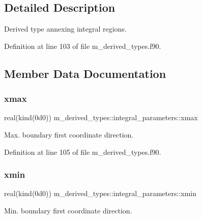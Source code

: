 \subsection{Detailed Description}
Derived type annexing integral regions. 

Definition at line 103 of file m\+\_\+derived\+\_\+types.\+f90.



\subsection{Member Data Documentation}
\mbox{\label{structm__derived__types_1_1integral__parameters_aede7130654b27625285fad0937c465d0}} 
\subsubsection{\texorpdfstring{xmax}{xmax}}
{\footnotesize\ttfamily real(kind(0d0)) m\+\_\+derived\+\_\+types\+::integral\+\_\+parameters\+::xmax}



Max. boundary first coordinate direction. 



Definition at line 105 of file m\+\_\+derived\+\_\+types.\+f90.

\mbox{\label{structm__derived__types_1_1integral__parameters_a7dfe7f156966273d43c89140f7212138}} 
\subsubsection{\texorpdfstring{xmin}{xmin}}
{\footnotesize\ttfamily real(kind(0d0)) m\+\_\+derived\+\_\+types\+::integral\+\_\+parameters\+::xmin}



Min. boundary first coordinate direction. 




